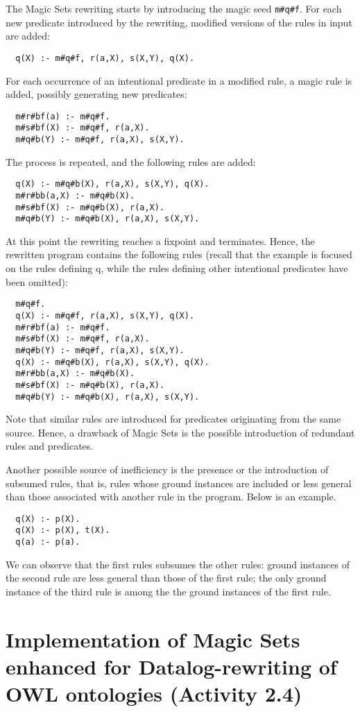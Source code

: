 \documentclass[oneside]{book}
\begin{document}
The Magic Sets rewriting starts by introducing the magic seed {\tt m\#q\#f}. For each new predicate introduced by the rewriting, modified versions of the rules in input are added:
\begin{verbatim}
  q(X) :- m#q#f, r(a,X), s(X,Y), q(X).
\end{verbatim}
For each occurrence of an intentional predicate in a modified rule, a magic rule is added, possibly generating new predicates:
\begin{verbatim}
  m#r#bf(a) :- m#q#f.
  m#s#bf(X) :- m#q#f, r(a,X).
  m#q#b(Y) :- m#q#f, r(a,X), s(X,Y).
\end{verbatim}
The process is repeated, and the following rules are added:
\begin{verbatim}
  q(X) :- m#q#b(X), r(a,X), s(X,Y), q(X).
  m#r#bb(a,X) :- m#q#b(X).
  m#s#bf(X) :- m#q#b(X), r(a,X).
  m#q#b(Y) :- m#q#b(X), r(a,X), s(X,Y).
\end{verbatim}
At this point the rewriting reaches a fixpoint and terminates. Hence, the rewritten program contains the following rules (recall that the example is focused on the rules defining q, while the rules defining other intentional predicates have been omitted):
\begin{verbatim}
  m#q#f.
  q(X) :- m#q#f, r(a,X), s(X,Y), q(X).
  m#r#bf(a) :- m#q#f.
  m#s#bf(X) :- m#q#f, r(a,X).
  m#q#b(Y) :- m#q#f, r(a,X), s(X,Y).
  q(X) :- m#q#b(X), r(a,X), s(X,Y), q(X).
  m#r#bb(a,X) :- m#q#b(X).
  m#s#bf(X) :- m#q#b(X), r(a,X).
  m#q#b(Y) :- m#q#b(X), r(a,X), s(X,Y).
\end{verbatim}
Note that similar rules are introduced for predicates originating from the same source. Hence, a drawback of Magic Sets is the possible introduction of redundant rules and predicates.

Another possible source of inefficiency is the presence or the introduction of subsumed rules, that is, rules whose ground instances are included or less general than those associated with another rule in the program. Below is an example.
\begin{verbatim}
  q(X) :- p(X).
  q(X) :- p(X), t(X).
  q(a) :- p(a).
\end{verbatim}
We can observe that the first rules subsumes the other rules: ground instances of the second rule are less general than those of the first rule; the only ground instance of the third rule is among the the ground instances of the first rule.


\section{Implementation of Magic Sets enhanced for Datalog-rewriting of OWL ontologies (Activity 2.4)}
\end{document}
